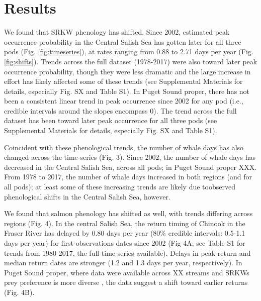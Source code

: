 \documentclass{article}
\begin{document}
\section*{Results}
\par We found that SRKW phenology has shifted. Since 2002, estimated peak occurrence probability in the Central Salish Sea has gotten later for all three pods (Fig. \ref{fig:timeseries}), at rates ranging from 0.88  to 2.71 days per year (Fig. \ref{fig:shifts}). Trends across the full dataset (1978-2017) were also toward later peak occurrence probability, though they were less dramatic and the large increase in effort has likely affected some of these trends (see Supplemental Materials for details, especially Fig. SX and Table S1).  In Puget Sound proper, there has not been a consistent linear trend in peak occurrence since 2002 for any pod (i.e., credible intervals around the slopes encompass 0). The trend across the full dataset has been toward later peak occurrence for all three pods (see Supplemental Materials for details, especially Fig. SX and Table S1). 
\par Coincident with these phenological trends, the number of whale days has also changed across the time-series (Fig. 3). Since 2002, the number of whale days has decreased in the Central Salish Sea, across all pods; in Puget Sound proper XXX. From 1978 to 2017, the number of whale days increased in both regions (and for all pods); at least some of these increasing trends are likely due toobserved phenological shifts in the Central Salish Sea, however. 
\par We found that salmon phenology has shifted as well, with trends differing across regions (Fig. 4). In the central Salish Sea, the return timing of Chinook in the Fraser River has delayed by 0.80 days per year (80\% credible intervals: 0.5-1.1 days per year) for first-observations dates since 2002 (Fig 4A; see Table S1 for trends from 1980-2017, the full time series available).  Delays in peak return and median return dates are stronger (1.2 and 1.3 days per year, respectively). In Puget Sound proper, where data were available across XX streams and SRKWs prey preference is more diverse \citep{ford2016,hanson2010}, the data suggest a shift toward earlier returns (Fig. 4B).
\end{document}
